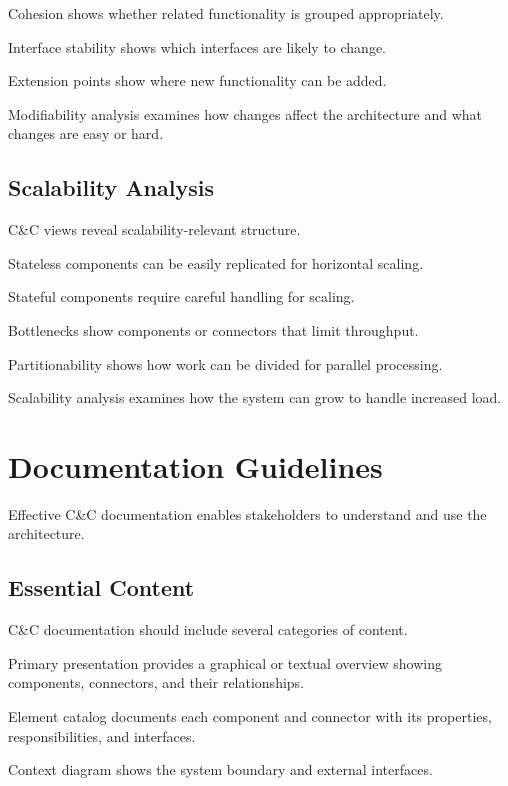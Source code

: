 \documentclass[11pt]{article}
\begin{document}
Cohesion shows whether related functionality is grouped appropriately.

Interface stability shows which interfaces are likely to change.

Extension points show where new functionality can be added.

Modifiability analysis examines how changes affect the architecture and what changes are easy or hard.

\subsection{Scalability Analysis}

C\&C views reveal scalability-relevant structure.

Stateless components can be easily replicated for horizontal scaling.

Stateful components require careful handling for scaling.

Bottlenecks show components or connectors that limit throughput.

Partitionability shows how work can be divided for parallel processing.

Scalability analysis examines how the system can grow to handle increased load.

\section{Documentation Guidelines}

Effective C\&C documentation enables stakeholders to understand and use the architecture.

\subsection{Essential Content}

C\&C documentation should include several categories of content.

Primary presentation provides a graphical or textual overview showing components, connectors, and their relationships.

Element catalog documents each component and connector with its properties, responsibilities, and interfaces.

Context diagram shows the system boundary and external interfaces.
\end{document}
